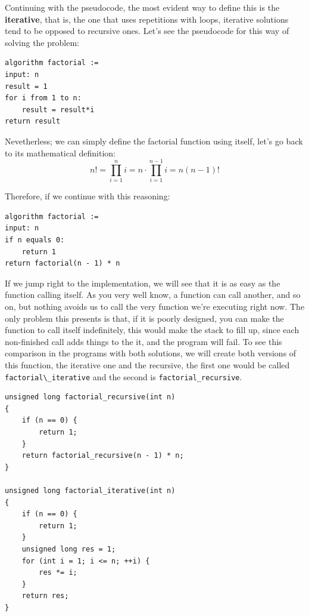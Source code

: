 \documentclass[a4paper]{article}
\begin{document}
Continuing with the pseudocode, the most evident way to define this is the
\textbf{iterative}, that is, the one that uses repetitions with loops, iterative
solutions tend to be opposed to recursive ones. Let's see the pseudocode
for this way of solving the problem:

\begin{lstlisting}[style=pseudoCode]
algorithm factorial :=
input: n
result = 1
for i from 1 to n:
    result = result*i
return result
\end{lstlisting}

Nevetherless; we can simply define the factorial function using itself,
let's go back to its mathematical definition:
$$
n! = \prod^{n}_{i=1}{i}= n\!\cdot\!\!\prod^{n-1}_{i=1}{i} = n\left(n-1\right)!
$$

Therefore, if we continue with this reasoning:

\begin{lstlisting}[style=pseudoCode]
algorithm factorial :=
input: n
if n equals 0:
    return 1
return factorial(n - 1) * n
\end{lstlisting}

If we jump right to the implementation, we will see that it is as easy as the
function calling itself. As you very well know, a function can call another,
and so on, but nothing avoids us to call the very function we're executing right
now. The only problem this presents is that, if it is poorly designed, you can
make the function to call itself indefinitely, this would make the stack to
fill up, since each non-finished call adds things to the it, and the program
will fail.
To see this comparison in the programs with both solutions, we will create both
versions of this function, the iterative one and the recursive, the first one
would be called \verb!factorial\_iterative! and the second is
\texttt{factorial\_recursive}.

\noindent
\begin{minipage}[H]{\linewidth}
\mbox{}
\begin{lstlisting}[style=C,
caption={Comparison of iterative and recursive algorithms},
label={lst:factorialIterativeVsRecursive}]
unsigned long factorial_recursive(int n)
{
    if (n == 0) {
        return 1;
    }
    return factorial_recursive(n - 1) * n;
}

unsigned long factorial_iterative(int n)
{
    if (n == 0) {
        return 1;
    }
    unsigned long res = 1;
    for (int i = 1; i <= n; ++i) {
        res *= i;
    }
    return res;
}
\end{lstlisting}
\end{minipage}
\end{document}
